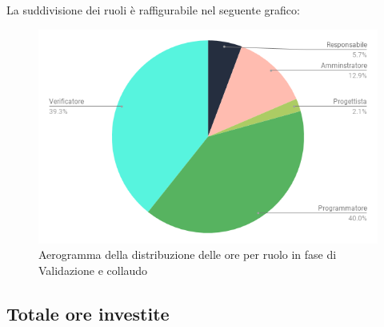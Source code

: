             \pagebreak

        La suddivisione dei ruoli è raffigurabile nel seguente grafico:
            \begin{figure}[H]
                \centering
                \includegraphics[scale=0.6]{immagini/vc_pie.png}
                \caption{Aerogramma della distribuzione delle ore per ruolo in fase di Validazione e collaudo}
            \end{figure}
    
    \subsection{Totale ore investite}
